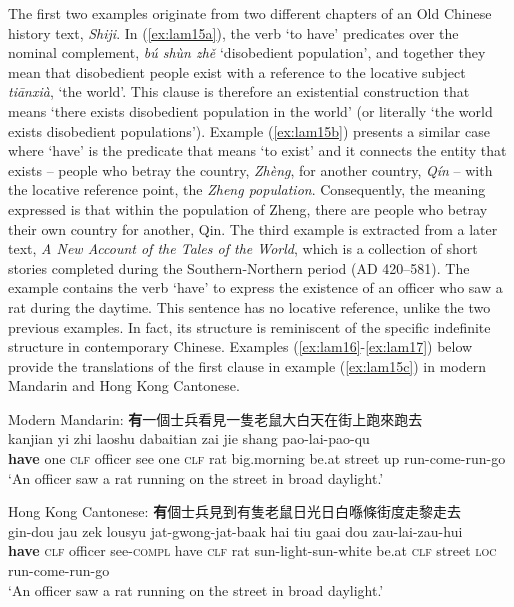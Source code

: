 \documentclass[output=paper]{langscibook}
\begin{document}
The first two examples originate from two different chapters of an Old Chinese history text, \emph{Shiji}. In (\ref{ex:lam15a}), the verb `to have' predicates over the nominal complement, \textit{bú shùn zhě} `disobedient population', and together they mean that disobedient people exist  with a reference to the locative subject \textit{tiānxià}, `the world'. This clause is therefore an existential construction that means `there exists disobedient population in the world' (or literally `the world exists disobedient populations'). Example (\ref{ex:lam15b}) presents a similar case where `have' is the predicate that means `to exist' and it connects the entity that exists – people who betray the country, \emph{Zhèng}, for another country, \emph{Qín} – with the locative reference point, the \emph{Zheng population}. Consequently, the meaning expressed is that within the population of Zheng, there are people who betray their own country for another, Qin. The third example is extracted from a later text, \emph{A New Account of the Tales of the World}, which is a collection of short stories completed during the Southern-Northern period (AD 420–581). The example contains the verb `have' to express the existence of an officer who saw a rat during the daytime. This sentence has no locative reference, unlike the two previous examples. In fact, its structure is reminiscent of the specific indefinite structure in contemporary Chinese. Examples (\ref{ex:lam16}-\ref{ex:lam17}) below provide the translations of the first clause in example (\ref{ex:lam15c}) in modern Mandarin and Hong Kong Cantonese. 

\ea Modern Mandarin: \textbf{有}一個士兵看見一隻老鼠大白天在街上跑來跑去 \label{ex:lam16}\\
   kanjian yi zhi laoshu dabaitian zai jie shang pao-lai-pao-qu\\
 \textbf{have} one \textsc{clf} officer see one \textsc{clf} rat big.morning be.at street	up run-come-run-go\\
  \glt `An officer saw a rat running on the street in broad daylight.'
\z 

\ea Hong Kong Cantonese: \textbf{有}個士兵見到有隻老鼠日光日白喺條街度走黎走去\label{ex:lam17}\\
   gin-dou jau zek lousyu jat-gwong-jat-baak hai	tiu gaai dou zau-lai-zau-hui\\
	\textbf{have} \textsc{clf} officer see-\textsc{compl} have \textsc{clf} rat sun-light-sun-white be.at \textsc{clf} street \textsc{loc} run-come-run-go\\
	\glt `An officer saw a rat running on the street in broad daylight.'
\z 
\end{document}
